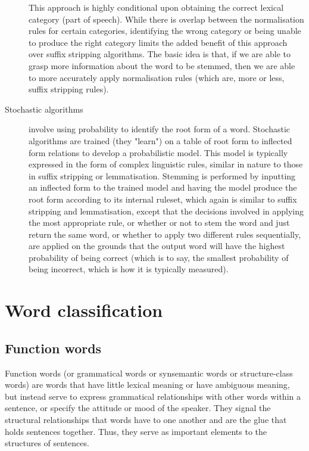 \begin{description}
        This approach is highly conditional upon obtaining the correct lexical category (part of speech). While there is overlap between the normalisation rules for certain categories, identifying the wrong category or being unable to produce the right category limits the added benefit of this approach over suffix stripping algorithms. The basic idea is that, if we are able to grasp more information about the word to be stemmed, then we are able to more accurately apply normalisation rules (which are, more or less, suffix stripping rules).
      \item[Stochastic algorithms] involve using probability to identify the root form of a word. Stochastic algorithms are trained (they "learn") on a table of root form to inflected form relations to develop a probabilistic model. This model is typically expressed in the form of complex linguistic rules, similar in nature to those in suffix stripping or lemmatisation. Stemming is performed by inputting an inflected form to the trained model and having the model produce the root form according to its internal ruleset, which again is similar to suffix stripping and lemmatisation, except that the decisions involved in applying the most appropriate rule, or whether or not to stem the word and just return the same word, or whether to apply two different rules sequentially, are applied on the grounds that the output word will have the highest probability of being correct (which is to say, the smallest probability of being incorrect, which is how it is typically measured).
    \end{description}


  \section{Word classification}

    \subsection{Function words}
    
      Function words (or grammatical words or synsemantic words or structure-class words) are words that have little lexical meaning or have ambiguous meaning, but instead serve to express grammatical relationships with other words within a sentence, or specify the attitude or mood of the speaker. They signal the structural relationships that words have to one another and are the glue that holds sentences together. Thus, they serve as important elements to the structures of sentences.
      
